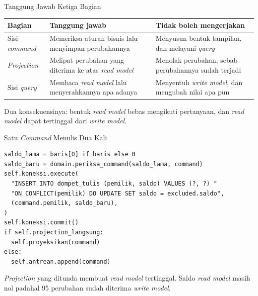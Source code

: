 \documentclass[aspectratio=169, table, 12pt]{beamer}
\begin{document}
\begin{frame}{{\Large Tanggung Jawab Ketiga Bagian}}
  \vspace{8pt}
  \centering
  \small
  \begin{tabularx}{0.95\textwidth}{|l|X|X|}
    \hline
    \textbf{Bagian} & \textbf{Tanggung jawab} & \textbf{Tidak boleh mengerjakan} \\
    \hline
    Sisi \textit{command} & Memeriksa aturan bisnis lalu menyimpan perubahannya & Menyusun bentuk tampilan, dan melayani \textit{query} \\
    \hline
    \textit{Projection} & Melipat perubahan yang diterima ke atas \textit{read model} & Menolak perubahan, sebab perubahannya sudah terjadi \\
    \hline
    Sisi \textit{query} & Membaca \textit{read model} lalu menyerahkannya apa adanya & Menyentuh \textit{write model}, dan mengubah nilai apa pun \\
    \hline
  \end{tabularx}

  \vspace{8pt}
  {\small Dua konsekuensinya: bentuk \textit{read model} bebas mengikuti pertanyaan, dan
  \textit{read model} dapat tertinggal dari \textit{write model}.}
\end{frame}

\begin{frame}[fragile]{{\Large Satu \textit{Command} Menulis Dua Kali}}
  \vspace{4pt}
\begin{lstlisting}[style=PythonStyle]
saldo_lama = baris[0] if baris else 0
saldo_baru = domain.periksa_command(saldo_lama, command)
self.koneksi.execute(
  "INSERT INTO dompet_tulis (pemilik, saldo) VALUES (?, ?) "
  "ON CONFLICT(pemilik) DO UPDATE SET saldo = excluded.saldo",
  (command.pemilik, saldo_baru),
)
self.koneksi.commit()
if self.projection_langsung:
  self.proyeksikan(command)
else:
  self.antrean.append(command)
\end{lstlisting}
  \vspace{4pt}
  {\small \textit{Projection} yang ditunda membuat \textit{read model} tertinggal. Saldo \textit{read model}
  masih nol padahal 95 perubahan sudah diterima \textit{write model}.}
\end{frame}
\end{document}
